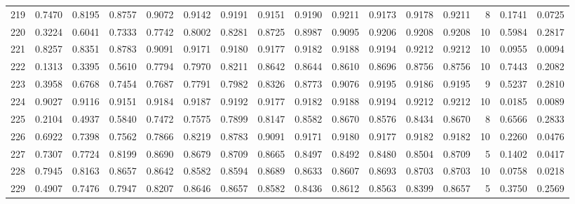 \begin{tabular}{lrrrrrrrrrrrrrrr}
219 &      0.7470 &  0.8195 &  0.8757 &  0.9072 &  0.9142 &  0.9191 &  0.9151 &  0.9190 &  0.9211 &  0.9173 &   0.9178 &     0.9211 &      8 &                    0.1741 &                     0.0725 \\
220 &      0.3224 &  0.6041 &  0.7333 &  0.7742 &  0.8002 &  0.8281 &  0.8725 &  0.8987 &  0.9095 &  0.9206 &   0.9208 &     0.9208 &     10 &                    0.5984 &                     0.2817 \\
221 &      0.8257 &  0.8351 &  0.8783 &  0.9091 &  0.9171 &  0.9180 &  0.9177 &  0.9182 &  0.9188 &  0.9194 &   0.9212 &     0.9212 &     10 &                    0.0955 &                     0.0094 \\
222 &      0.1313 &  0.3395 &  0.5610 &  0.7794 &  0.7970 &  0.8211 &  0.8642 &  0.8644 &  0.8610 &  0.8696 &   0.8756 &     0.8756 &     10 &                    0.7443 &                     0.2082 \\
223 &      0.3958 &  0.6768 &  0.7454 &  0.7687 &  0.7791 &  0.7982 &  0.8326 &  0.8773 &  0.9076 &  0.9195 &   0.9186 &     0.9195 &      9 &                    0.5237 &                     0.2810 \\
224 &      0.9027 &  0.9116 &  0.9151 &  0.9184 &  0.9187 &  0.9192 &  0.9177 &  0.9182 &  0.9188 &  0.9194 &   0.9212 &     0.9212 &     10 &                    0.0185 &                     0.0089 \\
225 &      0.2104 &  0.4937 &  0.5840 &  0.7472 &  0.7575 &  0.7899 &  0.8147 &  0.8582 &  0.8670 &  0.8576 &   0.8434 &     0.8670 &      8 &                    0.6566 &                     0.2833 \\
226 &      0.6922 &  0.7398 &  0.7562 &  0.7866 &  0.8219 &  0.8783 &  0.9091 &  0.9171 &  0.9180 &  0.9177 &   0.9182 &     0.9182 &     10 &                    0.2260 &                     0.0476 \\
227 &      0.7307 &  0.7724 &  0.8199 &  0.8690 &  0.8679 &  0.8709 &  0.8665 &  0.8497 &  0.8492 &  0.8480 &   0.8504 &     0.8709 &      5 &                    0.1402 &                     0.0417 \\
228 &      0.7945 &  0.8163 &  0.8657 &  0.8642 &  0.8582 &  0.8594 &  0.8689 &  0.8633 &  0.8607 &  0.8693 &   0.8703 &     0.8703 &     10 &                    0.0758 &                     0.0218 \\
229 &      0.4907 &  0.7476 &  0.7947 &  0.8207 &  0.8646 &  0.8657 &  0.8582 &  0.8436 &  0.8612 &  0.8563 &   0.8399 &     0.8657 &      5 &                    0.3750 &                     0.2569 \\

\end{tabular}
